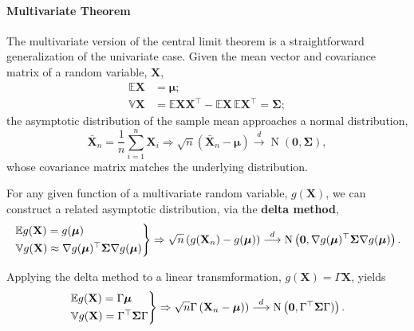 \documentclass[12pt, twoside, draft]{article}
\begin{document}
\paragraph{Multivariate Theorem}\label{sec:multivariate_central_limit_theorem}  The multivariate version of the central limit theorem is a straightforward generalization of the univariate case.  Given the mean vector and covariance matrix of a random variable, $\mathbf{X}$,
\begin{align}
\mathbb{E}\mathbf{X} &= \boldsymbol{\mu}; \\
\mathbb{V} \mathbf{X}  &= \mathbb{E} \mathbf{X} \mathbf{X}^\top - \mathbb{E}\mathbf{X} \,\mathbb{E}\mathbf{X}^\top = \boldsymbol{\Sigma};
\end{align}
the asymptotic distribution of the sample mean approaches a normal distribution,
\begin{equation}
\bar{\mathbf{X}}_n = \frac{1}{n} \sum_{i = 1}^n \mathbf{X}_i \Rightarrow
\sqrt{n} (\bar{\mathbf{X}}_n - \boldsymbol{\mu}) \stackrel{d}{\longrightarrow} \operatorname{N}(\mathbf{0}, \boldsymbol{\Sigma}),
\end{equation}
whose covariance matrix matches the underlying distribution.

For any given function of a multivariate random variable, $g(\mathbf{X})$, we can construct a related asymptotic distribution, via the \textbf{delta method},
\begin{equation}
\begin{rcases}
\mathbb{E}g(\mathbf{X}) = g(\boldsymbol{\mu}) \\
\mathbb{V}g(\mathbf{X}) \approx \nabla g(\boldsymbol{\mu})^\top \boldsymbol{\Sigma} \nabla g(\boldsymbol{\mu})
\end{rcases} \Rightarrow
\sqrt{n} \left(g(\mathbf{X}_n) - g(\boldsymbol{\mu}) \right) \stackrel{d}{\longrightarrow} \operatorname{N} \left( \mathbf{0}, \nabla g(\boldsymbol{\mu})^\top \boldsymbol{\Sigma} \nabla g(\boldsymbol{\mu}) \right).
\end{equation}

Applying the delta method to a linear transmformation, $g(\mathbf{X}) = \Gamma \mathbf{X}$, yields
\begin{equation}
\begin{rcases}
\mathbb{E}g(\mathbf{X}) = \Gamma \boldsymbol{\mu} \\
\mathbb{V}g(\mathbf{X}) = \Gamma^\top \boldsymbol{\Sigma} \Gamma
\end{rcases} \Rightarrow
\sqrt{n} \Gamma \left(\mathbf{X}_n - \boldsymbol{\mu}) \right) \stackrel{d}{\longrightarrow} \operatorname{N} \left( \mathbf{0}, \Gamma^\top \boldsymbol{\Sigma} \Gamma) \right).
\end{equation}
\end{document}
